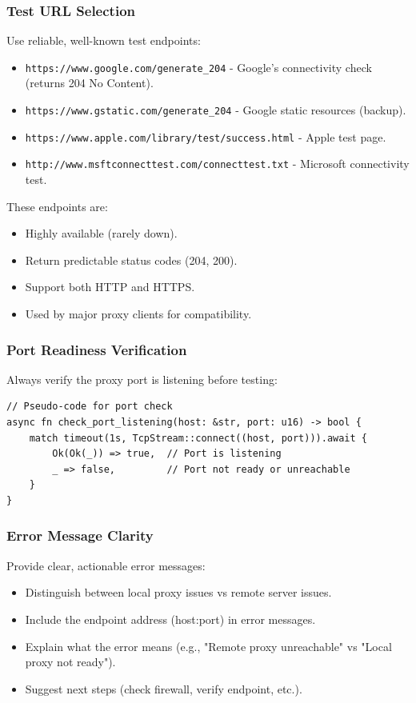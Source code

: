 \subsubsection{Test URL Selection}

Use reliable, well-known test endpoints:
\begin{itemize}
    \item \texttt{https://www.google.com/generate_204} - Google's connectivity check (returns 204 No Content).
    \item \texttt{https://www.gstatic.com/generate_204} - Google static resources (backup).
    \item \texttt{https://www.apple.com/library/test/success.html} - Apple test page.
    \item \texttt{http://www.msftconnecttest.com/connecttest.txt} - Microsoft connectivity test.
\end{itemize}

These endpoints are:
\begin{itemize}
    \item Highly available (rarely down).
    \item Return predictable status codes (204, 200).
    \item Support both HTTP and HTTPS.
    \item Used by major proxy clients for compatibility.
\end{itemize}

\subsubsection{Port Readiness Verification}

Always verify the proxy port is listening before testing:

\begin{verbatim}
// Pseudo-code for port check
async fn check_port_listening(host: &str, port: u16) -> bool {
    match timeout(1s, TcpStream::connect((host, port))).await {
        Ok(Ok(_)) => true,  // Port is listening
        _ => false,         // Port not ready or unreachable
    }
}
\end{verbatim}

\subsubsection{Error Message Clarity}

Provide clear, actionable error messages:
\begin{itemize}
    \item Distinguish between local proxy issues vs remote server issues.
    \item Include the endpoint address (host:port) in error messages.
    \item Explain what the error means (e.g., "Remote proxy unreachable" vs "Local proxy not ready").
    \item Suggest next steps (check firewall, verify endpoint, etc.).
\end{itemize}


